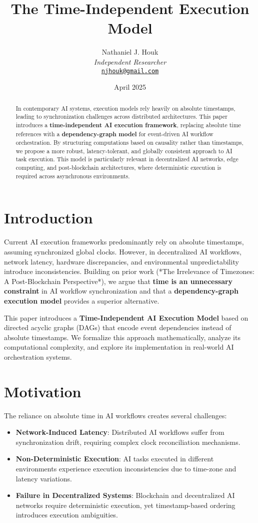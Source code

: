 \documentclass{article}
\title{The Time-Independent Execution Model}
\author{Nathaniel J. Houk\\
\textit{Independent Researcher}\\
\href{mailto:njhouk@gmail.com}{\texttt{njhouk@gmail.com}}}
\date{April 2025}
\begin{document}
\maketitle
\tableofcontents

\begin{abstract}
In contemporary AI systems, execution models rely heavily on absolute timestamps, leading to synchronization challenges across distributed architectures. This paper introduces a \textbf{time-independent AI execution framework}, replacing absolute time references with a \textbf{dependency-graph model} for event-driven AI workflow orchestration. By structuring computations based on causality rather than timestamps, we propose a more robust, latency-tolerant, and globally consistent approach to AI task execution. This model is particularly relevant in decentralized AI networks, edge computing, and post-blockchain architectures, where deterministic execution is required across asynchronous environments.
\end{abstract}

\section{Introduction}
Current AI execution frameworks predominantly rely on absolute timestamps, assuming synchronized global clocks. However, in decentralized AI workflows, network latency, hardware discrepancies, and environmental unpredictability introduce inconsistencies. Building on prior work (*The Irrelevance of Timezones: A Post-Blockchain Perspective*), we argue that \textbf{time is an unnecessary constraint} in AI workflow synchronization and that a \textbf{dependency-graph execution model} provides a superior alternative.

This paper introduces a \textbf{Time-Independent AI Execution Model} based on directed acyclic graphs (DAGs) that encode event dependencies instead of absolute timestamps. We formalize this approach mathematically, analyze its computational complexity, and explore its implementation in real-world AI orchestration systems.

\section{Motivation}
The reliance on absolute time in AI workflows creates several challenges:
\begin{itemize}
    \item \textbf{Network-Induced Latency}: Distributed AI workflows suffer from synchronization drift, requiring complex clock reconciliation mechanisms.
    \item \textbf{Non-Deterministic Execution}: AI tasks executed in different environments experience execution inconsistencies due to time-zone and latency variations.
    \item \textbf{Failure in Decentralized Systems}: Blockchain and decentralized AI networks require deterministic execution, yet timestamp-based ordering introduces execution ambiguities.
\end{itemize}
\end{document}
